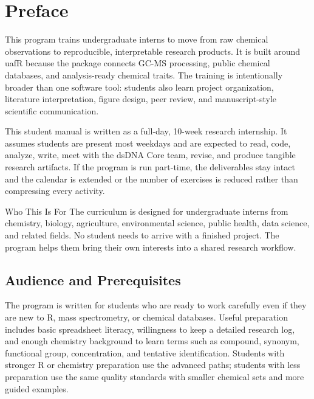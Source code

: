 \chapter*{Preface}

This program trains undergraduate interns to move from raw chemical observations to reproducible, interpretable research products. It is built around uafR because the package connects GC-MS processing, public chemical databases, and analysis-ready chemical traits. The training is intentionally broader than one software tool: students also learn project organization, literature interpretation, figure design, peer review, and manuscript-style scientific communication.

This student manual is written as a full-day, 10-week research internship. It assumes students are present most weekdays and are expected to read, code, analyze, write, meet with the dsDNA Core team, revise, and produce tangible research artifacts. If the program is run part-time, the deliverables stay intact and the calendar is extended or the number of exercises is reduced rather than compressing every activity.

\begin{programbox}{Who This Is For}
The curriculum is designed for undergraduate interns from chemistry, biology, agriculture, environmental science, public health, data science, and related fields. No student needs to arrive with a finished project. The program helps them bring their own interests into a shared research workflow.
\end{programbox}

\section*{Audience and Prerequisites}
The program is written for students who are ready to work carefully even if they are new to R, mass spectrometry, or chemical databases. Useful preparation includes basic spreadsheet literacy, willingness to keep a detailed research log, and enough chemistry background to learn terms such as compound, synonym, functional group, concentration, and tentative identification. Students with stronger R or chemistry preparation use the advanced paths; students with less preparation use the same quality standards with smaller chemical sets and more guided examples.

